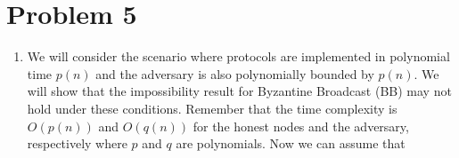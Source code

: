 \documentclass{article}
\begin{document}
\begin{enumerate}


    



\end{enumerate}

\section*{Problem 5}
\begin{enumerate}
\item %
We will consider the scenario where protocols are implemented in polynomial time $p(n)$ and the adversary is also polynomially bounded by $p(n)$. We will show that the impossibility result for Byzantine Broadcast (BB) may not hold under these conditions.
Remember that the time complexity is $O(p(n))$ and $O(q(n))$ for the honest nodes and the adversary, respectively where $p$ and $q$ are polynomials. Now we can assume that 

\end{enumerate}
\end{document}
